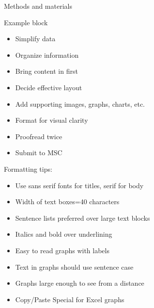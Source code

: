 \documentclass[pdf]{beamer}
\begin{document}
\begin{frame}{}
\begin{columns}[T]
\begin{column}{0.25\textwidth}
\begin{block}{Methods and materials}
\begin{center}
\begin{minipage}{0.8\linewidth}
\begin{exampleblock}{Example block}
\begin{itemize}
\item Simplify data
\item Organize information
\item Bring content in first
\item Decide effective layout
\item Add supporting images, graphs, charts, etc.
\item Format for visual clarity
\item Proofread twice
\item Submit to MSC
\end{itemize}
\end{exampleblock}
\end{minipage}
\end{center}

Formatting tips:
\begin{itemize}
\item Use sans serif fonts for titles, serif for body
\item Width of text boxes=40 characters
\item Sentence lists preferred over large text blocks
\item Italics and bold over underlining
\item Easy to read graphs with labels
\item Text in graphs should use sentence case
\item Graphs large enough to see from a distance
\item Copy/Paste Special for Excel graphs
\end{itemize}
\end{block}
\end{column}


\begin{column}{0.25\textwidth}

\end{column}
\end{columns}
\end{frame}
\end{document}
